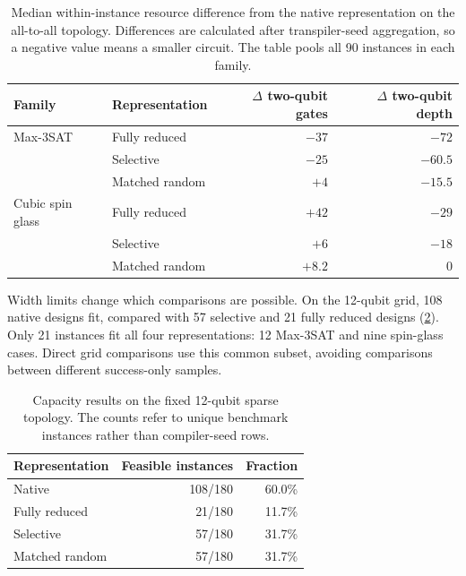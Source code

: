\documentclass[a4paper,onecolumn,11pt,unpublished]{quantumarticle}
\theoremstyle{remark}
\begin{document}
\begin{table}[!htbp]
    \centering
    \small
    \caption{Median within-instance resource difference from the native
    representation on the all-to-all topology.  Differences are calculated
    after transpiler-seed aggregation, so a negative value means a smaller
    circuit.  The table pools all 90 instances in each family.}
    \label{tab:e2-all-to-all-paired}
    \begin{tabular}{@{}llrr@{}}
        \toprule
        Family & Representation
        & $\Delta$ two-qubit gates & $\Delta$ two-qubit depth\\
        \midrule
        Max-3SAT & Fully reduced  & $-37$ & $-72$\\
                 & Selective      & $-25$ & $-60.5$\\
                 & Matched random & $+4$  & $-15.5$\\
        \addlinespace
        Cubic spin glass & Fully reduced  & $+42$ & $-29$\\
                         & Selective      & $+6$  & $-18$\\
                         & Matched random & $+8.2$ & $0$\\
        \bottomrule
    \end{tabular}
\end{table}

Width limits change which comparisons are possible. On the 12-qubit grid,
108 native designs fit, compared with 57 selective and 21 fully reduced
designs (\cref{tab:e2-sparse-capacity}). Only 21 instances fit all four
representations: 12 Max-3SAT and nine spin-glass cases. Direct grid
comparisons use this common subset, avoiding comparisons between different
success-only samples.

\begin{table}[!htbp]
    \centering
    \small
    \caption{Capacity results on the fixed 12-qubit sparse topology.  The
    counts refer to unique benchmark instances rather than compiler-seed
    rows.}
    \label{tab:e2-sparse-capacity}
    \begin{tabular}{@{}lrr@{}}
        \toprule
        Representation & Feasible instances & Fraction\\
        \midrule
        Native          & 108/180 & 60.0\%\\
        Fully reduced   & 21/180  & 11.7\%\\
        Selective       & 57/180  & 31.7\%\\
        Matched random  & 57/180  & 31.7\%\\
        \bottomrule
    \end{tabular}
\end{table}
\end{document}
